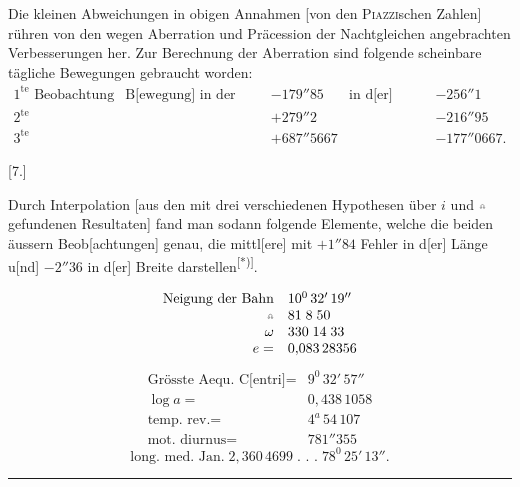 Die kleinen Abweichungen in obigen Annahmen [von den \textsc{Piazzi}schen Zahlen] rühren von den wegen Aberration und Präcession der Nachtgleichen
\clearpage
{}
\noindent angebrachten Verbesserungen her. Zur Berechnung der Aberration sind folgende scheinbare tägliche Bewegungen gebraucht worden:
{\small\setlength{\arraycolsep}{3pt}
\[
\begin{array}{llrlr}
1^{\text{te}}\text{ Beobachtung}&\text{B[ewegung] in der Länge}&-179''85&\text{in d[er] Breite}&-256''1\\
2^{\text{te}}&&+279''2&&-216''95\\
3^{\text{te}}&&+687''5667&&-177''0667.
\end{array}
\]}
\begin{center}[7.]\end{center}
\noindent\hspace*{\parindent}Durch Interpolation [aus den mit drei verschiedenen Hypothesen über $i$ und $\AstNode$ gefundenen Resultaten] fand man sodann folgende Elemente, welche die beiden äussern Beob[achtungen] genau, die mittl[ere] mit $+1''84$ Fehler in d[er] Länge u[nd] $-2''36$ in d[er] Breite darstellen\textsuperscript{[*)]}.\begingroup\renewcommand{\thefootnote}{[*)}\footnotetext{Vgl. Werke VI, S. 200.]}\endgroup
\par\medskip\noindent{\small [S. 17]}
\[
\begin{array}{rl}
\text{Neigung der Bahn}&10^0\,32'\,19''\\
\AstNode&81\;8\;50\\
\omega&330\;14\;33\\
e=&0{,}083\,28356
\end{array}
\]
\[
\begin{array}{rl}
\text{Grösste Aequ. C[entri]}=&9^0\,32'\,57''\\
\log a=&0{,}438\,1058\\
\text{temp. rev.}=&4^a\,54\,107\\
\text{mot. diurnus}=&781''355
\end{array}
\]
\[
\text{long. med. Jan.}\;2{,}360\,4699\;\text{. . .}\;78^0\,25'\,13''.
\]
\begin{center}\rule{.25\linewidth}{.3pt}\end{center}
\clearpage
\endgroup
